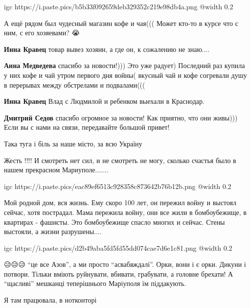 
\ifcmt
  igc https://i.paste.pics/b5b33f092659deb329352c219e98db4a.png
	@width 0.2
\fi


А ещё рядом был чудесный магазин кофе и чая((( Может кто-то в курсе что с ним, с его хозяевами? 😭

\begin{itemize} %
\textbf{Инна Кравец} товар вывез хозяин, а где он, к сожалению не знаю....

\textbf{Анна Медведева} спасибо за новости!))) Это уже радует)
Последний раз купила у них кофе и чай утром первого дня войны( вкусный чай и кофе согревали душу в перерывах между обстрелами и подвалами(((

\textbf{Инна Кравец} Влад с Людмилой и ребенком выехали в Краснодар.

\textbf{Дмитрий Седов} спасибо огромное за новости! Как приятно, что они живы))) Если вы с нами на связи, передавайте большой привет!
\end{itemize} %


Така туга і біль за наше місто, за всю Україну


Жесть !!!! И смотреть нет сил, и не смотреть не могу, сколько счастья было в
нашем прекрасном Мариуполе.......

\ifcmt
  igc https://i.paste.pics/eac89ef6513c928358c873642b76b12b.png
	@width 0.2
\fi


Мой родной дом, вся жизнь. Ему скоро 100 лет, он пережил войну и выстоял сейчас,
хотя пострадал. Мама пережила войну, они все жили в бомбоубежище, в квартирах -
фашисты. Это бомбоубежище спасло многих и сейчас. Стены выстояли, а жизни
разрушены....


\ifcmt
  igc https://i.paste.pics/d2b49aba5fd5fd55dd074cae7d6e1c81.png
	@width 0.2
\fi


😥😥😥 \enquote{це все Азов}, а ми просто \enquote{асвабвждалі}. Орки, вони і є орки. Дикуни і
потвори. Тільки вміють руйнувати, вбивати, грабувати, а головне брехати! А
\enquote{щасливі} мешканці теперішнього Маріуполя їм піддакують.🤮


Я там працювала, в нотконторі
